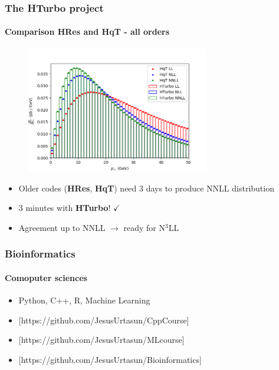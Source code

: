 \documentclass[aspectratio=43]{beamer}
\begin{document}
\begin{frame}
	
	\frametitle{The HTurbo project}
	\framesubtitle{Comparison HRes and HqT - all orders}

	
	\begin{figure}
		\includegraphics[width = 8cm]{plots/hturbo_all_orders.png}
	\end{figure}

	\begin{itemize}
		\item \footnotesize Older codes (\textbf{HRes}, \textbf{HqT}) need 3 days to produce NNLL distribution
		\item {\color{blue} 3 minutes with \textbf{HTurbo}!} {\color{darkgreen}$\checkmark$} 
		\item \footnotesize Agreement up to NNLL $\longrightarrow$ {\color{blue}ready for N$^{3}$LL}
	\end{itemize}

\end{frame}

\begin{frame}


\end{frame}

\begin{frame}
	
	\frametitle{Bioinformatics}
	\framesubtitle{Comoputer sciences}
	
	\begin{itemize}
		\item Python, C++, R, Machine Learning
		\item {\color{blue}[https://github.com/JesusUrtasun/CppCourse]}
		\item {\color{blue}[https://github.com/JesusUrtasun/MLcourse]}
		\item {\color{blue}[https://github.com/JesusUrtasun/Bioinformatics]}
	\end{itemize}

\end{frame}
\end{document}
